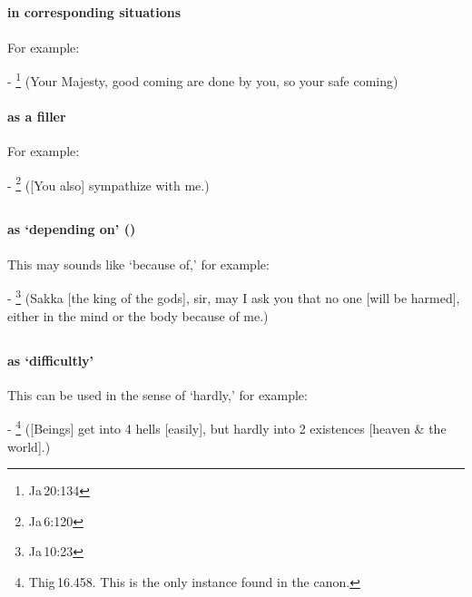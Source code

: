 \subsection*{}\label{nip:atho}
\paragraph*{ in corresponding situations} For example:\par
- \footnote{Ja\,20:134} (Your Majesty, good coming are done by you, so your safe coming) \par
\paragraph*{ as a filler} For example:\par
- \footnote{Ja\,6:120} ([You also] sympathize with me.) \par

\subsection*{}\label{nip:kate}
\paragraph*{ as `depending on' ()} This may sounds like `because of,' for example:\par
- \footnote{Ja\,10:23} (Sakka [the king of the gods], sir, may I ask you that no one [will be harmed], either in the mind or the body because of me.) \par

\subsection*{}\label{nip:kathaynci}
\paragraph*{ as `difficultly'} This can be used in the sense of `hardly,' for example:\par
- \footnote{Thig\,16.458. This is the only instance found in the canon.} ([Beings] get into 4 hells [easily], but hardly into 2 existences [heaven \& the world].) \par

